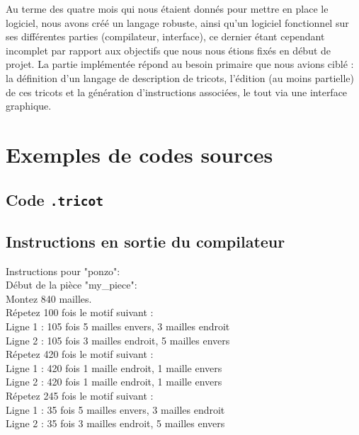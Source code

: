 \documentclass{article}
\begin{document}
Au terme des quatre mois qui nous étaient donnés pour mettre en place le logiciel, nous avons créé un langage robuste, ainsi qu'un 
logiciel fonctionnel sur ses différentes parties (compilateur, interface), ce dernier étant cependant incomplet par rapport aux 
objectifs que nous nous étions fixés en début de projet. La partie implémentée répond au besoin primaire que nous avions ciblé : 
la définition d'un langage de description de tricots, l'édition (au moins partielle) de ces tricots et 
la génération d'instructions associées, le tout via une interface graphique.

\newpage

\appendix

\section{Exemples de codes sources}

\subsection{Code \texttt{.tricot}}




\subsection{Instructions en sortie du compilateur}

\setlength{\parindent}{0cm}

Instructions pour "ponzo":\\

Début de la pièce "my\_piece":\\
Montez 840 mailles.\\

Répetez 100 fois le motif suivant :\\
Ligne 1 : 105 fois 5 mailles envers, 3 mailles endroit\\
Ligne 2 : 105 fois 3 mailles endroit, 5 mailles envers\\


Répetez 420 fois le motif suivant :\\
Ligne 1 : 420 fois 1 maille endroit, 1 maille envers\\
Ligne 2 : 420 fois 1 maille endroit, 1 maille envers\\


Répetez 245 fois le motif suivant :\\
Ligne 1 : 35 fois 5 mailles envers, 3 mailles endroit\\
Ligne 2 : 35 fois 3 mailles endroit, 5 mailles envers\\
\end{document}
